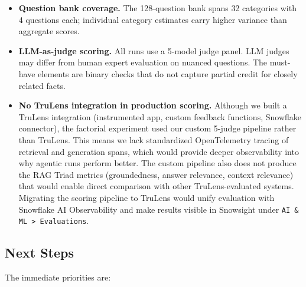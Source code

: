 \documentclass[10pt,letterpaper]{article}
\begin{document}
\begin{itemize}[nosep]
  \item \textbf{Question bank coverage.} The 128-question bank spans 32 categories with 4 questions each; individual category estimates carry higher variance than aggregate scores.
  \item \textbf{LLM-as-judge scoring.} All runs use a 5-model judge panel. LLM judges may differ from human expert evaluation on nuanced questions. The must-have elements are binary checks that do not capture partial credit for closely related facts.
  \item \textbf{No TruLens integration in production scoring.} Although we built a TruLens integration (instrumented app, custom feedback functions, Snowflake connector), the factorial experiment used our custom 5-judge pipeline rather than TruLens. This means we lack standardized OpenTelemetry tracing of retrieval and generation spans, which would provide deeper observability into why agentic runs perform better. The custom pipeline also does not produce the RAG Triad metrics (groundedness, answer relevance, context relevance) that would enable direct comparison with other TruLens-evaluated systems. Migrating the scoring pipeline to TruLens would unify evaluation with Snowflake AI Observability and make results visible in Snowsight under \texttt{AI \& ML > Evaluations}.
\end{itemize}

\subsection*{Next Steps}

The immediate priorities are:
\end{document}
